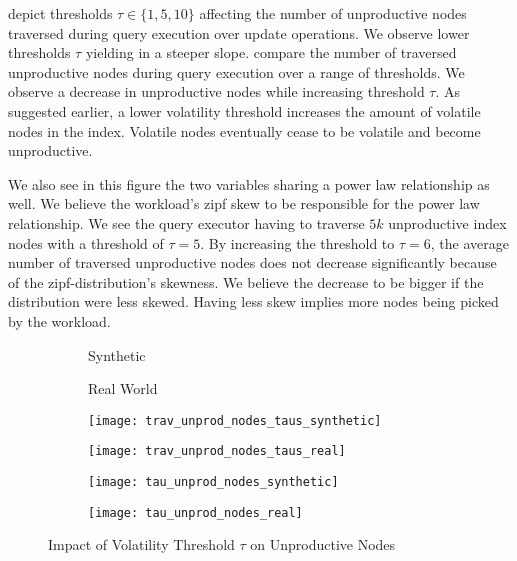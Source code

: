 \message{ !name(thesis.tex)}\documentclass[abstracton,12pt]{scrartcl}
\theoremstyle{definition}
\begin{document}
depict thresholds $\tau \in \{1,5,10\}$ affecting the number of unproductive
nodes traversed during query execution over update operations. We observe lower
thresholds $\tau$ yielding in a steeper slope.
 compare the
number of traversed unproductive nodes during query execution over a range of
thresholds. We observe a decrease in unproductive nodes while increasing
threshold $\tau$. As suggested earlier, a lower volatility threshold
increases the amount of volatile nodes in the index. Volatile nodes eventually
cease to be volatile and become unproductive. 

We also see in this figure
the two variables sharing a power law relationship as well. We believe the
workload's zipf skew to be responsible for the power law relationship. We see
the query executor having to traverse $5k$ unproductive index nodes with a
threshold of $\tau = 5$. By increasing the threshold to $\tau = 6$, the average
number of traversed unproductive nodes does not decrease significantly because
of the zipf-distribution's skewness. We believe the decrease to be bigger if the
distribution were less skewed. Having less skew implies more nodes being picked
by the workload.

\begin{figure}
  \centering
  \begin{subfigure}{0.49\linewidth}
    \centering
    Synthetic
  \end{subfigure}
  \begin{subfigure}{0.49\linewidth}
    \centering
    Real World
  \end{subfigure}
  \begin{subfigure}{0.49\linewidth}
    \centering
    \texttt{[image: trav\_unprod\_nodes\_taus\_synthetic]}
    \caption{}
    \label{fig:trav_unprod_nodes_taus_synthetic}
  \end{subfigure}
  \begin{subfigure}{0.49\linewidth}
    \centering
    \texttt{[image: trav\_unprod\_nodes\_taus\_real]}
    \caption{}
    \label{fig:trav_unprod_nodes_taus_real}
  \end{subfigure}
  \begin{subfigure}{0.49\linewidth}
    \centering
    \texttt{[image: tau\_unprod\_nodes\_synthetic]}
    \caption{}
    \label{fig:tau_trav_unprod_nodes_synthetic}
  \end{subfigure}
  \begin{subfigure}{0.49\linewidth}
    \centering
    \texttt{[image: tau\_unprod\_nodes\_real]}
    \caption{}
    \label{fig:tau_trav_unprod_nodes_real}
  \end{subfigure}
  \caption{Impact of Volatility Threshold $\tau$ on Unproductive Nodes}
\end{figure}
\end{document}
